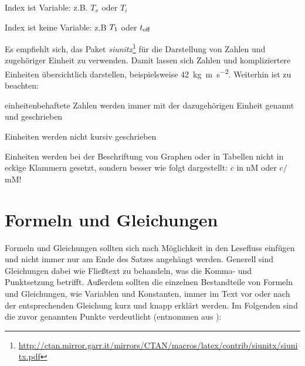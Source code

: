 \begin{compactitem}
	\item Index ist Variable: z.B. $T_x$ oder $T_i$
	\item Index ist keine Variable: z.B $T_{\rm{1}}$ oder $t_{\rm{off}}$
\end{compactitem}

Es empfiehlt sich, das Paket \textit{siunitx}\footnote{\url{http://ctan.mirror.garr.it/mirrors/CTAN/macros/latex/contrib/siunitx/siunitx.pdf}} für die Darstellung von Zahlen und zugehöriger Einheit zu verwenden. Damit lassen sich Zahlen und kompliziertere Einheiten übersichtlich darstellen, beispielsweise \SI{42}{\kilo\gram\metre\per\square\second}. Weiterhin ist zu beachten:

\begin{compactitem}
	\item einheitenbehaftete Zahlen werden immer mit der dazugehörigen Einheit genannt und geschrieben
	\item Einheiten werden nicht kursiv geschrieben
	\item Einheiten werden bei der Beschriftung von Graphen oder in Tabellen nicht in eckige Klammern gesetzt, sondern besser wie folgt dargestellt: $c$ in nM oder $c /$mM!
\end{compactitem}

\section{Formeln und Gleichungen}

Formeln und Gleichungen sollten sich nach Möglichkeit in den Lesefluss einfügen und nicht immer nur am Ende des Satzes angehängt werden. Generell sind Gleichungen dabei wie Fließtext zu behandeln, was die Komma- und Punktsetzung betrifft. Außerdem sollten die einzelnen Bestandteile von Formeln und Gleichungen, wie Variablen und Konstanten, immer im Text vor oder nach der entsprechenden Gleichung kurz und knapp erklärt werden. Im Folgenden sind die zuvor genannten Punkte verdeutlicht (entnommen aus \cite{MA_Kappel}):


